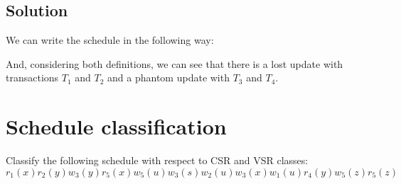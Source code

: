 \documentclass[12pt, a4paper]{report}
\begin{document}
    \subsection*{Solution}
        We can write the schedule in the following way:
        \begin{table}[H]
            \centering
        \end{table}
        And, considering both definitions,  we can see that there is a lost update with transactions $T_1$ and $T_2$ and a phantom update with $T_3$ and $T_4$. 

    \newpage
    
    \section{Schedule classification}
        Classify the following schedule with respect to CSR and VSR classes: 
        \[r_1(x) r_2(y) w_3(y) r_5(x) w_5(u) w_3(s)w_2(u) w_3(x) w_1(u) r_4(y) w_5(z) r_5(z)\]
\end{document}
